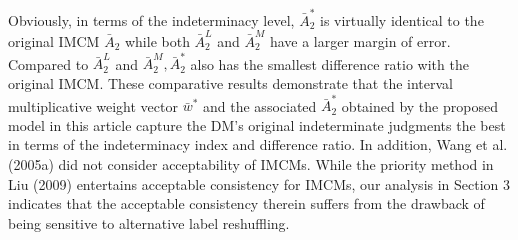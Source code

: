 \documentclass[10pt]{article}
\begin{document}
Obviously, in terms of the indeterminacy level, $\bar{A}_{2}^{*}$ is virtually identical to the original IMCM $\bar{A}_{2}$ while both $\bar{A}_{2}^{L}$ and $\bar{A}_{2}^{M}$ have a larger margin of error. Compared to $\bar{A}_{2}^{L}$ and $\bar{A}_{2}^{M}, \bar{A}_{2}^{*}$ also has the smallest difference ratio with the original IMCM. These comparative results demonstrate that the interval multiplicative weight vector $\bar{w}^{*}$ and the associated $\bar{A}_{2}^{*}$ obtained by the proposed model in this article capture the DM's original indeterminate judgments the best in terms of the indeterminacy index and difference ratio. In addition, Wang et al. (2005a) did not consider acceptability of IMCMs. While the priority method in Liu (2009) entertains acceptable consistency for IMCMs, our analysis in Section 3 indicates that the acceptable consistency therein suffers from the drawback of being sensitive to alternative label reshuffling.
\end{document}
